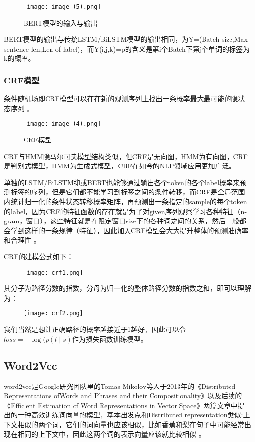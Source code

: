 \documentclass{article}
\begin{document}
\begin{figure}[H]
	\centering
    \texttt{[image: image (5).png]}
    \caption{BERT模型的输入与输出}
    \label{fig:BERT的输入与输出}
\end{figure}

BERT模型的输出与传统LSTM/BiLSTM模型的输出相同，为Y=(Batch size,Max sentence len,Len of label)，而Y(i,j,k)=p的含义是第i个Batch下第j个单词的标签为k的概率。

\subsubsection{CRF模型}
条件随机场即CRF模型可以在在新的观测序列上找出一条概率最大最可能的隐状态序列\cite{huang2015bidirectional} 。

\begin{figure}[H]
	\centering
    \texttt{[image: image (4).png]}
    \caption{CRF模型}
    \label{fig:CRF模型}
\end{figure}

CRF与HMM隐马尔可夫模型结构类似，但CRF是无向图，HMM为有向图，CRF是判别式模型，HMM为生成式模型，CRF在如今的NLP领域应用更加广泛。

单独的LSTM/BiLSTM抑或BERT也能够通过输出各个token的各个label概率来预测标签的序列，但是它们都不能学习到标签之间的条件转移，而CRF是全局范围内统计归一化的条件状态转移概率矩阵，再预测出一条指定的sample的每个token的label，因为CRF的特征函数的存在就是为了对given序列观察学习各种特征（n-gram，窗口），这些特征就是在限定窗口size下的各种词之间的关系，然后一般都会学到这样的一条规律（特征），因此加入CRF模型会大大提升整体的预测准确率和合理性\cite{huang2015bidirectional} 。

CRF的建模公式如下：

\begin{figure}[H]
	\centering
    \texttt{[image: crf1.png]}
    \label{fig:CRF1}
\end{figure}

其分子为路径分数的指数，分母为归一化的整体路径分数的指数之和，即可以理解为：

\begin{figure}[H]
	\centering
    \texttt{[image: crf2.png]}
    \label{fig:CRF2}
\end{figure}


我们当然是想让正确路径的概率越接近于1越好，因此可以令$loss=-\log(p(l \mid s)$作为损失函数训练模型。
\subsection{Word2Vec}
word2vec是Google研究团队里的Tomas Mikolov等人于2013年的《Distributed Representations ofWords and Phrases and their Compositionality》以及后续的《Efficient Estimation of Word Representations in Vector Space》两篇文章中提出的一种高效训练词向量的模型，基本出发点和Distributed representation类似:上下文相似的两个词，它们的词向量也应该相似，比如香蕉和梨在句子中可能经常出现在相同的上下文中，因此这两个词的表示向量应该就比较相似\cite{mikolov2013efficient} 。
\end{document}

